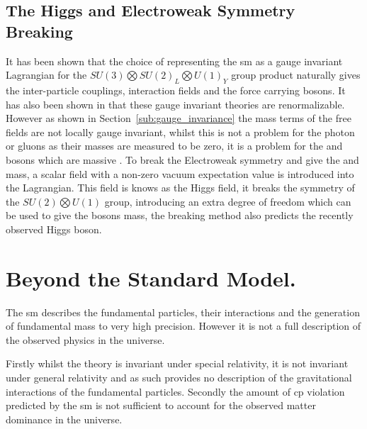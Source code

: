 \subsection{The Higgs and Electroweak Symmetry Breaking} %
\label{sub:the_higgs_and_electro_weak_symmetry_breaking}
It has been shown that the choice of representing the \ac{sm} as a gauge 
invariant Lagrangian for the $SU(3)\bigotimes SU(2)_{L} \bigotimes U(1)_{Y}$ 
group product naturally gives the inter-particle couplings, interaction fields 
and the force carrying bosons. It has also been shown in  
that these gauge invariant theories are renormalizable. However as shown in 
Section~\ref{sub:gauge_invariance} the mass terms of the free fields are not 
locally gauge invariant, whilst this is not a problem for the photon or gluons 
as their masses are measured to be zero, it is a problem for the \PW and \PZ 
bosons which are massive . To break the 
Electroweak symmetry and give the \PW and \PZ mass, a scalar field with a 
non-zero vacuum expectation value is introduced into the 
Lagrangian. This field is knows as the Higgs 
field, it breaks the symmetry of the $SU(2)\bigotimes U(1)$ group, introducing 
an extra degree of freedom which can be used to give the bosons mass, the 
breaking method also predicts the recently observed 
 Higgs boson.



\section{Beyond the Standard Model.} %
\label{sec:beyond_the_standard_mode_}
The \ac{sm} describes the fundamental particles, their 
interactions and the generation of fundamental mass to very high precision. 
 However it is not a full description of the observed physics in the universe.

Firstly whilst the theory is invariant under special relativity, it is not 
invariant under general relativity and as such provides no description of the 
gravitational interactions of the fundamental particles. 
Secondly the amount of \ac{cp} violation predicted by the \ac{sm} is not 
sufficient to account for the observed matter dominance in the universe.

